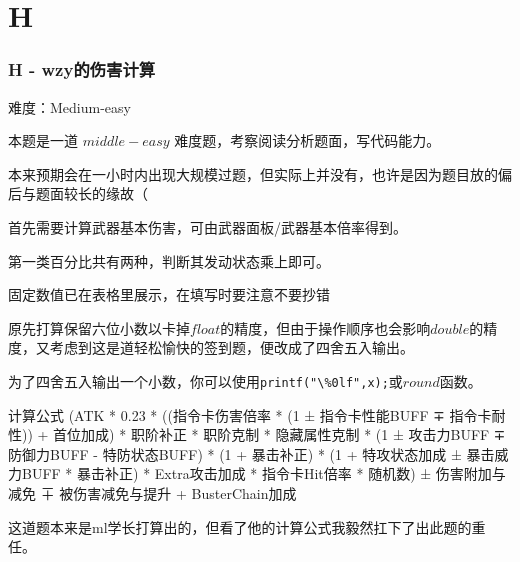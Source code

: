 \section{H}
\begin{frame}
\frametitle{H - wzy的伤害计算}
难度：Medium-easy

本题是一道 $middle-easy$ 难度题，考察阅读分析题面，写代码能力。

本来预期会在一小时内出现大规模过题，但实际上并没有，也许是因为题目放的偏后与题面较长的缘故（

首先需要计算武器基本伤害，可由武器面板/武器基本倍率得到。

第一类百分比共有两种，判断其发动状态乘上即可。

固定数值已在表格里展示，在填写时要注意不要抄错

原先打算保留六位小数以卡掉$float$的精度，但由于操作顺序也会影响$double$的精度，又考虑到这是道轻松愉快的签到题，便改成了四舍五入输出。

为了四舍五入输出一个小数，你可以使用\lstinline|printf("\%0lf",x);|或$round$函数。


\end{frame}

\begin{frame}

\begin{block}{计算公式}
    (ATK * 0.23 * ((指令卡伤害倍率 * (1 ± 指令卡性能BUFF ∓ 指令卡耐性)) + 首位加成) * 职阶补正 * 职阶克制 * 隐藏属性克制 * (1 ± 攻击力BUFF ∓ 防御力BUFF - 特防状态BUFF) * (1 + 暴击补正) * (1 + 特攻状态加成 ± 暴击威力BUFF * 暴击补正) * Extra攻击加成 * 指令卡Hit倍率 * 随机数) ± 伤害附加与减免 ∓ 被伤害减免与提升 + BusterChain加成
\end{block}

这道题本来是ml学长打算出的，但看了他的计算公式我毅然扛下了出此题的重任。

\end{frame}
